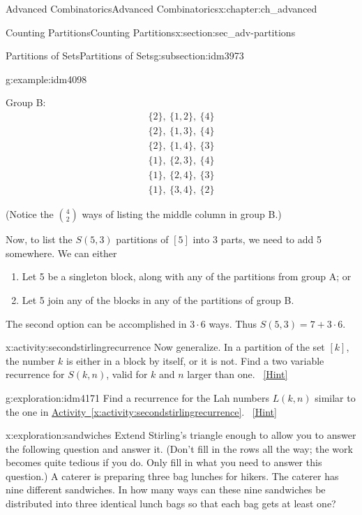 \documentclass[oneside,10pt,]{book}
\numberwithin{equation}{chapter}
\begin{document}
\begin{chapterptx}{Advanced Combinatorics}{}{Advanced Combinatorics}{}{}{x:chapter:ch_advanced}
\begin{sectionptx}{Counting Partitions}{}{Counting Partitions}{}{}{x:section:sec_adv-partitions}
\begin{subsectionptx}{Partitions of Sets}{}{Partitions of Sets}{}{}{g:subsection:idm3973}
\begin{example}{}{g:example:idm4098}
\begin{sidebyside}{2}{0.05}{0.05}{0.1}
\begin{sbspanel}{0.3}
\par
Group B:%
\begin{gather*}
\{2\}, ~ \{1,2\}, ~ \{4\}\\
\{2\}, ~ \{1,3\}, ~ \{4\}\\
\{2\}, ~ \{1,4\}, ~ \{3\}\\
\{1\}, ~ \{2,3\}, ~ \{4\}\\
\{1\}, ~ \{2,4\}, ~ \{3\}\\
\{1\}, ~ \{3,4\}, ~ \{2\}
\end{gather*}
%
\end{sbspanel}%
\end{sidebyside}%
\par
(Notice the \(\binom{4}{2}\) ways of listing the middle column in group B.)%
\par
Now, to list the \(S(5,3)\) partitions of \([5]\) into \(3\) parts, we need to add 5 somewhere.  We can either%
\begin{enumerate}[label=\alph*.]
\item{}Let 5 be a singleton block, along with any of the partitions from group A; or%
\item{}Let 5 join any of the blocks in any of the partitions of group B.%
\end{enumerate}
The second option can be accomplished in \(3\cdot 6\) ways.  Thus \(S(5,3) = 7 + 3\cdot 6\).%
\end{example}
\begin{activity}{}{x:activity:secondstirlingrecurrence}%
Now generalize.  In a partition of the set \([k]\), the number \(k\) is either in a block by itself, or it is not.  Find a two variable recurrence for \(S(k,n)\), valid for \(k\) and \(n\) larger than one.%
\qquad~\hfill{\tiny\hyperlink{g:hint:idm4141-back}{[Hint]}}\end{activity}
\begin{exploration}{}{g:exploration:idm4171}%
Find a recurrence for the Lah numbers \(L(k,n)\) similar to the one in \hyperref[x:activity:secondstirlingrecurrence]{Activity~\ref{x:activity:secondstirlingrecurrence}}.%
\qquad~\hfill{\tiny\hyperlink{g:hint:idm4176-back}{[Hint]}}\end{exploration}
\begin{exploration}{}{x:exploration:sandwiches}%
Extend Stirling's triangle enough to allow you to answer the following question and answer it. (Don't fill in the rows all the way; the work becomes quite tedious if you do. Only fill in what you need to answer this question.) A caterer is preparing three bag lunches for hikers. The caterer has nine different sandwiches. In how many ways can these nine sandwiches be distributed into three identical lunch bags so that each bag gets at least one?%

\end{exploration}
\end{subsectionptx}
\end{sectionptx}
\end{chapterptx}
\end{document}

